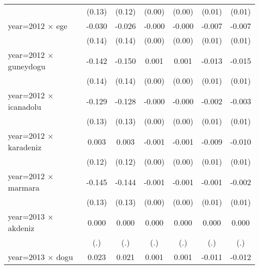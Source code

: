 {\begin{tabular}{l*{6}{c}}
                    &      (0.13)         &      (0.12)         &      (0.00)         &      (0.00)         &      (0.01)         &      (0.01)         \\
year=2012 $\times$ ege&      -0.030         &      -0.026         &      -0.000         &      -0.000         &      -0.007         &      -0.007         \\
                    &      (0.14)         &      (0.14)         &      (0.00)         &      (0.00)         &      (0.01)         &      (0.01)         \\
year=2012 $\times$ guneydogu&      -0.142         &      -0.150         &       0.001         &       0.001         &      -0.013         &      -0.015         \\
                    &      (0.14)         &      (0.14)         &      (0.00)         &      (0.00)         &      (0.01)         &      (0.01)         \\
year=2012 $\times$ icanadolu&      -0.129         &      -0.128         &      -0.000         &      -0.000         &      -0.002         &      -0.003         \\
                    &      (0.13)         &      (0.13)         &      (0.00)         &      (0.00)         &      (0.01)         &      (0.01)         \\
year=2012 $\times$ karadeniz&       0.003         &       0.003         &      -0.001         &      -0.001         &      -0.009         &      -0.010         \\
                    &      (0.12)         &      (0.12)         &      (0.00)         &      (0.00)         &      (0.01)         &      (0.01)         \\
year=2012 $\times$ marmara&      -0.145         &      -0.144         &      -0.001         &      -0.001         &      -0.001         &      -0.002         \\
                    &      (0.13)         &      (0.13)         &      (0.00)         &      (0.00)         &      (0.01)         &      (0.01)         \\
year=2013 $\times$ akdeniz&       0.000         &       0.000         &       0.000         &       0.000         &       0.000         &       0.000         \\
                    &         (.)         &         (.)         &         (.)         &         (.)         &         (.)         &         (.)         \\
year=2013 $\times$ dogu&       0.023         &       0.021         &       0.001         &       0.001         &      -0.011         &      -0.012         \\

\end{tabular}}
